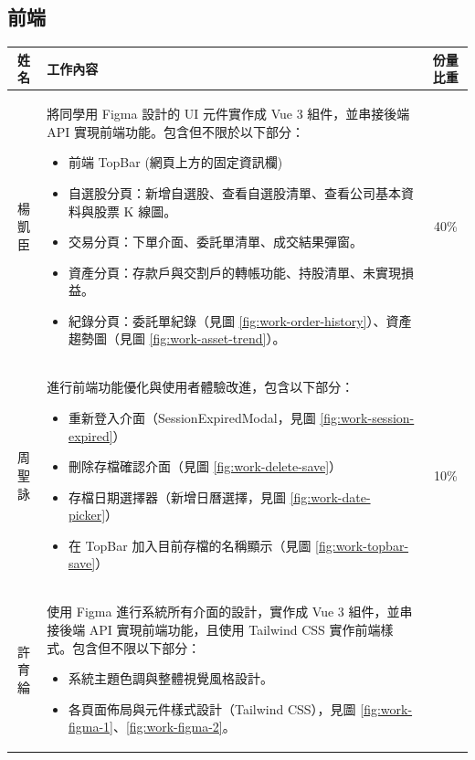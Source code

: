 \documentclass[UTF8, a4paper, 12pt, fontset=none]{ctexart}
\begin{document}
\subsection{前端}

\begin{longtable}{|c|p{11cm}|c|}
    \hline
    姓名 & 工作內容 & 份量比重 \\
    \hline
    \endhead
    楊凱臣 & 將同學用 Figma 設計的 UI 元件實作成 Vue 3 組件，並串接後端 API 實現前端功能。包含但不限於以下部分：
    \begin{itemize}[leftmargin=*, topsep=3pt, partopsep=0pt, parsep=0pt, itemsep=3pt]
        \item 前端 TopBar (網頁上方的固定資訊欄)
        \item 自選股分頁：新增自選股、查看自選股清單、查看公司基本資料與股票 K 線圖。
        \item 交易分頁：下單介面、委託單清單、成交結果彈窗。
        \item 資產分頁：存款戶與交割戶的轉帳功能、持股清單、未實現損益。
        \item 紀錄分頁：委託單紀錄（見圖 \ref{fig:work-order-history}）、資產趨勢圖（見圖 \ref{fig:work-asset-trend}）。
    \end{itemize} & 40\% \\
    \hline
    周聖詠 & 進行前端功能優化與使用者體驗改進，包含以下部分：
    \begin{itemize}[leftmargin=*, topsep=3pt, partopsep=0pt, parsep=0pt, itemsep=3pt]
        \item 重新登入介面（SessionExpiredModal，見圖 \ref{fig:work-session-expired}）
        \item 刪除存檔確認介面（見圖 \ref{fig:work-delete-save}）
        \item 存檔日期選擇器（新增日曆選擇，見圖 \ref{fig:work-date-picker}）
        \item 在 TopBar 加入目前存檔的名稱顯示（見圖 \ref{fig:work-topbar-save}）
    \end{itemize} & 10\% \\
    \hline
    許育綸 & 使用 Figma 進行系統所有介面的設計，實作成 Vue 3 組件，並串接後端 API 實現前端功能，且使用 Tailwind CSS 實作前端樣式。包含但不限以下部分：
    \begin{itemize}[leftmargin=*, topsep=3pt, partopsep=0pt, parsep=0pt, itemsep=3pt]
        \item 系統主題色調與整體視覺風格設計。
        \item 各頁面佈局與元件樣式設計（Tailwind CSS），見圖 \ref{fig:work-figma-1}、\ref{fig:work-figma-2}。

\end{itemize}
\end{longtable}
\end{document}

